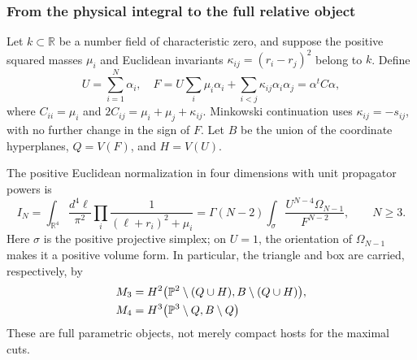 \documentclass[11pt,a4paper,oneside]{article}
\theoremstyle{plain}
\theoremstyle{definition}
\theoremstyle{remark}
\numberwithin{equation}{section}
\begin{document}
\subsubsection{From the physical integral to the full relative object}
Let $k\subset\mathbb R$ be a number field of characteristic zero, and suppose the positive squared masses $\mu_i$ and Euclidean invariants
$\kappa_{ij}=(r_i-r_j)^2$ belong to $k$. Define
\[
 U=\sum_{i=1}^N\alpha_i,\quad
 F=U\sum_i\mu_i\alpha_i+\sum_{i<j}\kappa_{ij}\alpha_i\alpha_j
   =\alpha^t C\alpha,
\]
where $C_{ii}=\mu_i$ and $2C_{ij}=\mu_i+\mu_j+\kappa_{ij}$.
Minkowski continuation uses $\kappa_{ij}=-s_{ij}$, with no further change in the sign of $F$.
Let $B$ be the union of the coordinate hyperplanes, $Q=V(F)$, and $H=V(U)$.

The positive Euclidean normalization in four dimensions with unit propagator powers is
\begin{equation}\label{unified:eq:onephysical}
 I_N=\int_{\mathbb R^4}\frac{d^4\ell}{\pi^2}
           \prod_i\frac1{(\ell+r_i)^2+\mu_i}
     =\Gamma(N-2)\int_{\sigma}
        \frac{U^{N-4}\Omega_{N-1}}{F^{N-2}},\qquad N\ge3.
\end{equation}
Here $\sigma$ is the positive projective simplex; on $U=1$, the orientation of $\Omega_{N-1}$ makes it a positive volume form.
In particular, the triangle and box are carried, respectively, by
\begin{align}\label{unified:eq:onepairs}
 M_3&=H^2\bigl(\mathbb P^2\setminus(Q\cup H),
             B\setminus(Q\cup H)\bigr),\notag\\
 M_4&=H^3\bigl(\mathbb P^3\setminus Q,B\setminus Q\bigr)
\end{align}
These are full parametric objects, not merely compact hosts for the maximal cuts.
\end{document}
